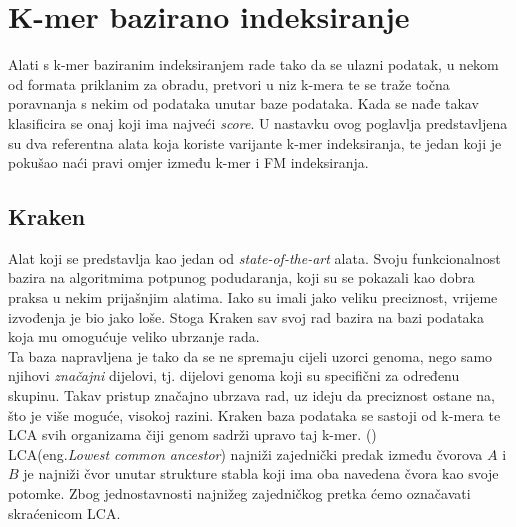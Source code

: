 \documentclass[times, utf8, seminar]{fer}
\begin{document}
\chapter{K-mer bazirano indeksiranje}
Alati s k-mer baziranim indeksiranjem rade tako da se ulazni podatak, u nekom od formata priklanim za obradu, pretvori u niz k-mera te se traže točna poravnanja s nekim od podataka unutar baze podataka. Kada se nađe takav klasificira se onaj koji ima najveći \textit{score}. U nastavku ovog poglavlja predstavljena su dva referentna alata koja koriste varijante k-mer indeksiranja, te jedan koji je pokušao naći pravi omjer između k-mer i FM indeksiranja.
\section{Kraken}
Alat koji se predstavlja kao jedan od \textit{state-of-the-art} alata. Svoju funkcionalnost bazira na algoritmima potpunog podudaranja, koji su se pokazali kao dobra praksa u nekim prijašnjim alatima. Iako su imali jako veliku preciznost, vrijeme izvođenja je bio jako loše. Stoga Kraken sav svoj rad bazira na bazi podataka koja mu omogućuje veliko ubrzanje rada.
\\Ta baza napravljena je tako da se ne spremaju cijeli uzorci genoma, nego samo njihovi \textit{značajni} dijelovi, tj. dijelovi genoma koji su specifični za određenu skupinu. Takav pristup značajno ubrzava rad, uz ideju da preciznost ostane na, što je više moguće, visokoj razini. Kraken baza podataka se sastoji od k-mera te LCA svih organizama čiji genom sadrži upravo taj k-mer. (\cite{Kraken})
\\LCA(eng.\textit{Lowest common ancestor}) najniži zajednički predak između čvorova $A$ i $B$ je najniži čvor unutar strukture stabla koji ima oba navedena čvora kao svoje potomke. Zbog jednostavnosti najnižeg zajedničkog pretka ćemo označavati skraćenicom LCA.
\end{document}
